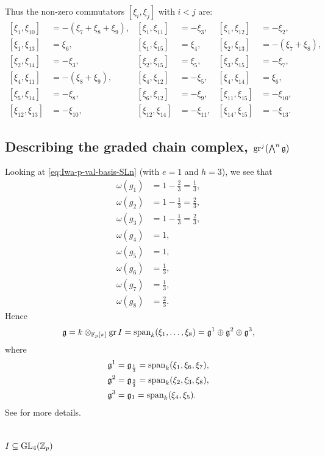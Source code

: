 Thus the non-zero commutators $[\xi_{i},\xi_{j}]$ with $i<j$ are:
\begin{equation}
  \label{eq:xi_ij-SL4}
  \begin{aligned}
    [\xi_{1},\xi_{10}] &= -(\xi_{7}+\xi_{8}+\xi_{9}), & [\xi_{1},\xi_{11}] &= -\xi_{3}, & [\xi_{1},\xi_{12}] &= -\xi_{2}, \\
    [\xi_{1},\xi_{13}] &= \xi_{6}, & [\xi_{1},\xi_{15}] &= \xi_{4}, & [\xi_{2},\xi_{13}] &= -(\xi_{7}+\xi_{8}), \\
    [\xi_{2},\xi_{14}] &= -\xi_{3}, & [\xi_{2},\xi_{15}] &= \xi_{5}, & [\xi_{3},\xi_{15}] &= -\xi_{7}, \\
    [\xi_{4},\xi_{11}] &= -(\xi_{8}+\xi_{9}), & [\xi_{4},\xi_{12}] &= -\xi_{5}, & [\xi_{4},\xi_{14}] &= \xi_{6}, \\
    [\xi_{5},\xi_{14}] &= -\xi_{8}, & [\xi_{6},\xi_{12}] &= -\xi_{9}, & [\xi_{11},\xi_{15}] &= -\xi_{10}, \\
    [\xi_{12},\xi_{13}] &= -\xi_{10}, & [\xi_{12},\xi_{14}] &= -\xi_{11}, & [\xi_{14},\xi_{15}] &= -\xi_{13}.
  \end{aligned}
\end{equation}

\subsection{Describing the graded chain complex, \texorpdfstring{$\operatorname{gr}^{j}\bigl(\bigwedge^{n}\mathfrak{g}\bigr)$}{grj(wedge-n g)}}%
\label{subsec:graded-complex-SL4}

Looking at \eqref{eq:Iwa-p-val-basis-SLn} (with $e=1$ and $h=3$), we see that
\begin{align*}
  \omega(g_{1}) &= 1-\frac{2}{3} = \frac{1}{3}, \\
  \omega(g_{2}) &= 1-\frac{1}{3} = \frac{2}{3}, \\
  \omega(g_{3}) &= 1-\frac{1}{3} = \frac{2}{3}, \\
  \omega(g_{4}) &= 1, \\
  \omega(g_{5}) &= 1, \\
  \omega(g_{6}) &= \frac{1}{3}, \\
  \omega(g_{7}) &= \frac{1}{3}, \\
  \omega(g_{8}) &= \frac{2}{3}.
\end{align*}
Hence
\begin{equation*}
  \mathfrak{g} = k \otimes_{\mathbb{F}_{p}[\pi]} \operatorname{gr} I = \operatorname{span}_{k}(\xi_{1},\dotsc,\xi_{8}) = \mathfrak{g}^{1} \oplus \mathfrak{g}^{2} \oplus \mathfrak{g}^{3},
\end{equation*}
where
\begin{align*}
  \mathfrak{g}^{1} &= \mathfrak{g}_{\frac{1}{3}} = \operatorname{span}_{k}(\xi_{1},\xi_{6},\xi_{7}), \\
  \mathfrak{g}^{2} &= \mathfrak{g}_{\frac{2}{3}} = \operatorname{span}_{k}(\xi_{2},\xi_{3},\xi_{8}), \\
  \mathfrak{g}^{3} &= \mathfrak{g}_{1} = \operatorname{span}_{k}(\xi_{4},\xi_{5}).
\end{align*}
See  for more details.




\section{\texorpdfstring{$I \subseteq \operatorname{GL}_{4}(\mathbb{Z}_{p})$}{I in GL4(Zp)}}%
\label{sec:GL4-calc}



